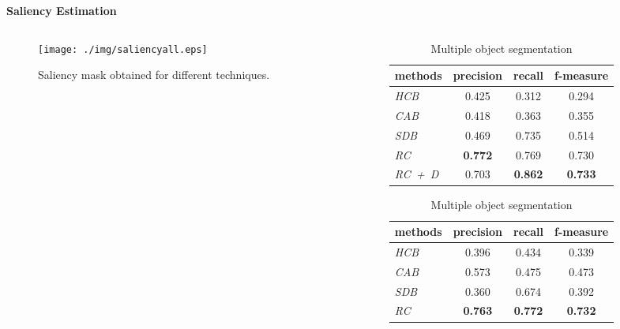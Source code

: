 \begin{frame}{\textbf{Saliency Estimation}}
\begin{columns}
	\begin{column}{0.48\textwidth}
		\begin{figure}
		\centering
		\texttt{[image: ./img/saliencyall.eps]}
		\caption{Saliency mask obtained for different techniques.}
	\end{figure}
	\end{column}
	\begin{column}{0.48\textwidth}
	\begin{scriptsize}
		\begin{table}[htbp]
		\caption{Results on Weizmann dataset\footnotemark}
			\begin{subtable}{\textwidth}
			\centering
			\caption{Single object segmentation}
			\begin{tabular}{|l|c|c|c|} \hline
			\textbf{methods} & \textbf{precision} & \textbf{recall} & \textbf{f-measure} \\ \hline
 	    			\emph{HCB} & 0.425 & 0.312 & 0.294 \\
	 			\emph{CAB} & 0.418 & 0.363 & 0.355 \\
 	 			\emph{SDB} & 0.469 & 0.735 & 0.514 \\
	 			\emph{RC}  & {\color{yellow}\textbf{0.772}} & 0.769 & 0.730 \\
	 			\emph{RC~+~D} & 0.703	& {\color{yellow}\textbf{0.862}} & {\color{yellow}\textbf{0.733}}	\\ \hline
   			\end{tabular}
  	 	\end{subtable}
		\hspace{2em}
		\begin{subtable}{\textwidth}
			\centering
			\caption{Multiple object segmentation}			
			\begin{tabular}{|l|c|c|c|} \hline
				\textbf{methods} & \textbf{precision} & \textbf{recall} & \textbf{f-measure} \\ \hline
				\emph{HCB} & 0.396 & 0.434 & 0.339 \\
				\emph{CAB} & 0.573 & 0.475 & 0.473 \\
				\emph{SDB} & 0.360 & 0.674 & 0.392 \\
				\emph{RC}  & {\color{yellow}\textbf{0.763}} & {\color{yellow}\textbf{0.772}} & {\color{yellow}\textbf{0.732}} \\ \hline
   			\end{tabular}
	   	\end{subtable}
 		\end{table} 
	\end{scriptsize}
	\end{column}
\end{columns}
\end{frame}


